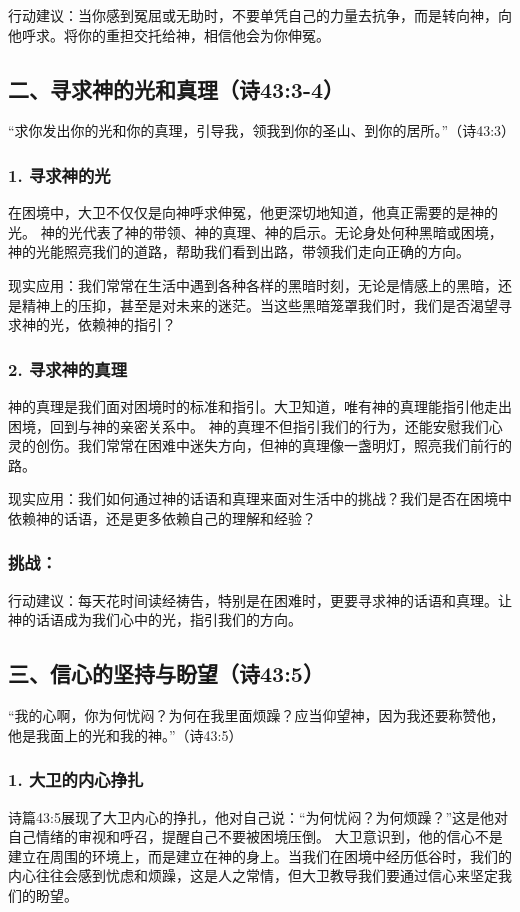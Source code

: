 \documentclass[a4paper, 12pt]{article}
\begin{document}
行动建议：当你感到冤屈或无助时，不要单凭自己的力量去抗争，而是转向神，向他呼求。将你的重担交托给神，相信他会为你伸冤。
\subsection*{二、寻求神的光和真理（诗43:3-4）}
“求你发出你的光和你的真理，引导我，领我到你的圣山、到你的居所。”（诗43:3）

\subsubsection*{1. 寻求神的光}
\hspace{0.6cm}在困境中，大卫不仅仅是向神呼求伸冤，他更深切地知道，他真正需要的是神的光。
神的光代表了神的带领、神的真理、神的启示。无论身处何种黑暗或困境，神的光能照亮我们的道路，帮助我们看到出路，带领我们走向正确的方向。

现实应用：我们常常在生活中遇到各种各样的黑暗时刻，无论是情感上的黑暗，还是精神上的压抑，甚至是对未来的迷茫。当这些黑暗笼罩我们时，我们是否渴望寻求神的光，依赖神的指引？
\subsubsection*{2. 寻求神的真理}
\hspace{0.6cm}神的真理是我们面对困境时的标准和指引。大卫知道，唯有神的真理能指引他走出困境，回到与神的亲密关系中。
神的真理不但指引我们的行为，还能安慰我们心灵的创伤。我们常常在困难中迷失方向，但神的真理像一盏明灯，照亮我们前行的路。

现实应用：我们如何通过神的话语和真理来面对生活中的挑战？我们是否在困境中依赖神的话语，还是更多依赖自己的理解和经验？
\subsubsection*{挑战：}

行动建议：每天花时间读经祷告，特别是在困难时，更要寻求神的话语和真理。让神的话语成为我们心中的光，指引我们的方向。
\subsection*{三、信心的坚持与盼望（诗43:5）}
“我的心啊，你为何忧闷？为何在我里面烦躁？应当仰望神，因为我还要称赞他，他是我面上的光和我的神。”（诗43:5）

\subsubsection*{1. 大卫的内心挣扎}
\hspace{0.6cm}诗篇43:5展现了大卫内心的挣扎，他对自己说：“为何忧闷？为何烦躁？”这是他对自己情绪的审视和呼召，提醒自己不要被困境压倒。
大卫意识到，他的信心不是建立在周围的环境上，而是建立在神的身上。当我们在困境中经历低谷时，我们的内心往往会感到忧虑和烦躁，这是人之常情，但大卫教导我们要通过信心来坚定我们的盼望。
\end{document}
